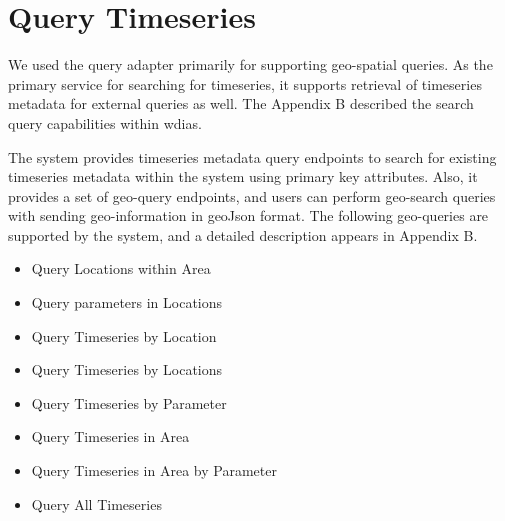 \section{Query Timeseries}
\label{se:query}

We used the query adapter primarily for supporting geo-spatial queries. As the primary service for searching for timeseries, it supports retrieval of timeseries metadata for external queries as well. The Appendix B described the search query capabilities within \acrshort{wdias}.

The system provides timeseries metadata query endpoints to search for existing timeseries metadata within the system using primary key attributes.
Also, it provides a set of geo-query endpoints, and users can perform geo-search queries with sending geo-information in geoJson format. The following geo-queries are supported by the system, and a detailed description appears in Appendix B.
\begin{itemize}
    \item Query Locations within Area
    \item Query parameters in Locations
    \item Query Timeseries by Location
    \item Query Timeseries by Locations
    \item Query Timeseries by Parameter
    \item Query Timeseries in Area
    \item Query Timeseries in Area by Parameter
    \item Query All Timeseries
\end{itemize}
